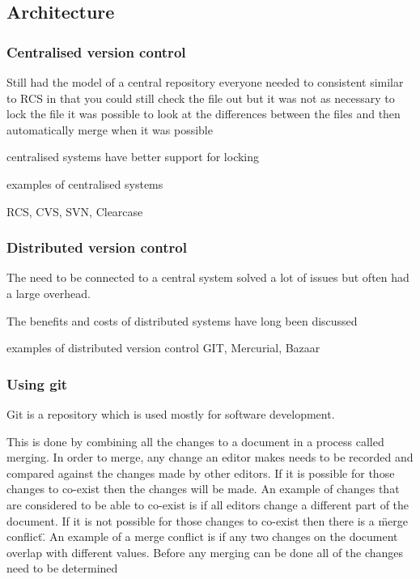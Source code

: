 \subsection{Architecture}
\subsubsection{Centralised version control}
Still had the model of a central repository everyone needed to consistent
similar to RCS in that you could still check the file out but it was not as necessary to lock the file
it was possible to look at the differences between the files and then automatically merge when it was possible

centralised systems have better support for locking  

examples of centralised systems

RCS, CVS, SVN, Clearcase


\subsubsection{Distributed version control}
The need to be connected to a central system solved a lot of issues but often had a large overhead.  


The benefits and costs of distributed systems have long been discussed

examples of distributed version control
GIT, Mercurial, Bazaar


\subsubsection{Using git}
Git is a repository which is used mostly for software development.

This is done by combining all the changes to a document in a process called merging. 
In order to merge, any change an editor makes needs to be recorded and compared against the changes made by other editors.
If it is possible for those changes to co-exist then the changes will be made.
An example of changes that are considered to be able to co-exist is if all editors change a different part of the document.
If it is not possible for those changes to co-exist then there is a \"merge conflict\".
An example of a merge conflict is if any two changes on the document overlap with different values.
Before any merging can be done all of the changes need to be determined

